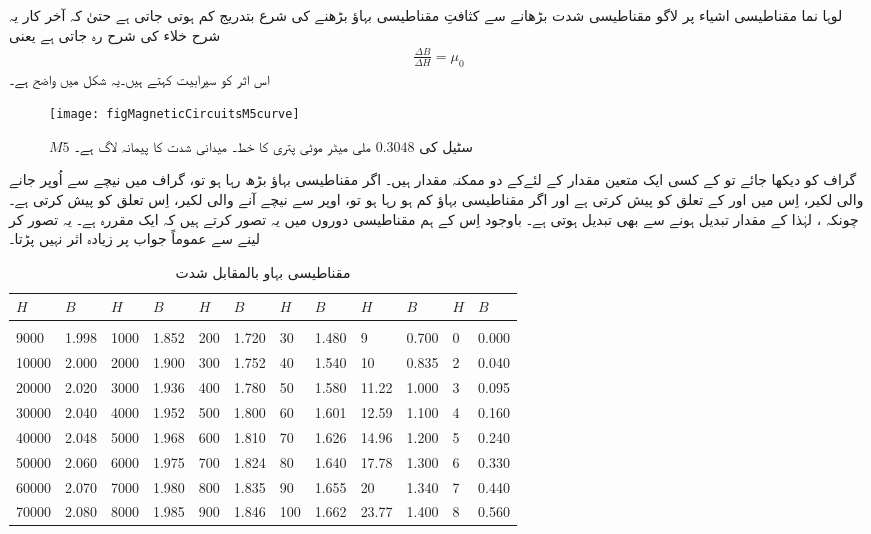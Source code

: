 لوہا نما مقناطیسی اشیاء پر لاگو مقناطیسی شدت بڑھانے سے کثافتِ مقناطیسی بہاؤ بڑھنے کی شرع بتدریج کم ہوتی جاتی ہے حتیٰ کہ آخر کار یہ شرح خلاء کی شرح   رہ جاتی ہے یعنی
\begin{align}
\frac{\Delta B}{\Delta H}=\mu_0
\end{align}
اس اثر کو سیرابیت کہتے ہیں۔یہ شکل   میں واضح ہے۔
\begin{figure}
\centering
\texttt{[image: figMagneticCircuitsM5curve]}
\caption{$M5$ سٹیل کی $0.3048$ ملی میٹر موٹی پتری کا خط۔ میدانی شدت کا پیمانہ لاگ ہے۔}
\label{شکل_مقناطیسی_ادوار_ایم_پانچ_پتری_کا_خط}
\end{figure}
%
گراف کو دیکھا جائے تو  کے کسی ایک متعین مقدار  کے لئےکے دو ممکنہ مقدار ہیں۔ اگر مقناطیسی بہاؤ بڑھ رہا ہو تو، گراف میں نیچے سے اُوپر جانے والی لکیر، اِس میں  اور  کے تعلق کو پیش کرتی ہے اور اگر مقناطیسی بہاؤ کم ہو رہا ہو تو، اوپر سے نیچے آنے والی لکیر، اِس تعلق کو پیش کرتی ہے۔  چونکہ  ، لہٰذا  کے  مقدار تبدیل ہونے سے  بھی تبدیل ہوتی ہے۔ باوجود اِس کے ہم مقناطیسی دوروں میں یہ تصور کرتے ہیں کہ  ایک مقررہ ہے۔ یہ تصور کر لینے سے عموماً جواب پر زیادہ اثر نہیں پڑتا۔
%
\begin{table}
\begin{tabular}{l l l l   l l l l   l l l l}
$H$&$B$&$H$&$B$&$H$&$B$&$H$&$B$&$H$&$B$&$H$&$B$\\
\hline\\
9000&1.998&1000&1.852&           200&1.720 &30&1.480               &9&0.700&  0&0.000    \\
10000&2.000&2000&1.900&         300&1.752 &40&1.540           &10&0.835&  2&0.040    \\
20000&2.020&3000&1.936&         400&1.780 &50&1.580          &11.22&1.000&  3&0.095    \\
30000&2.040& 4000&1.952&        500&1.800 &60&1.601         &12.59&1.100 &  4&0.160    \\
40000&2.048&5000&1.968&         600&1.810 &70&1.626          &14.96&1.200&   5&0.240    \\
50000&2.060&6000&1.975&         700&1.824 &80&1.640         &17.78&1.300&  6&0.330    \\
60000&2.070&7000&1.980&         800&1.835  &90&1.655         &20&1.340&  7&0.440    \\
 70000&2.080&8000&1.985&        900&1.846 &100&1.662          &23.77&1.400& 8&0.560    \\
\hline
\end{tabular}
\caption{مقناطیسی بہاو بالمقابل شدت}
\label{جدول_مقناطیسی_ادوار_کثافت_بہاو_بالمقابل_شدت}
\end{table}
